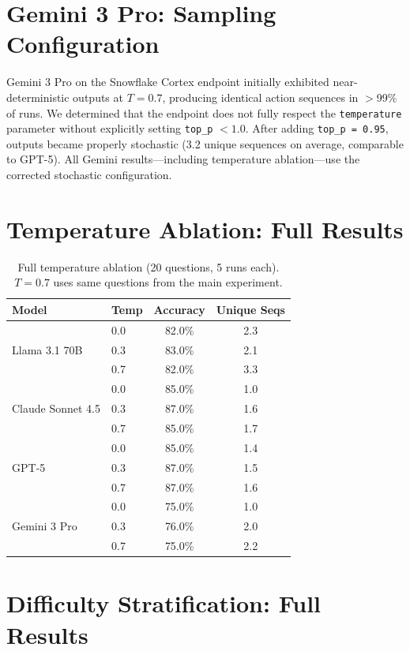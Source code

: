 \documentclass{article}
\begin{document}
\section{Gemini 3 Pro: Sampling Configuration}
\label{sec:gemini_note}

Gemini 3 Pro on the Snowflake Cortex endpoint initially exhibited near-deterministic outputs at $T\!=\!0.7$, producing identical action sequences in $>$99\% of runs. We determined that the endpoint does not fully respect the \texttt{temperature} parameter without explicitly setting \texttt{top\_p} $< 1.0$. After adding \texttt{top\_p = 0.95}, outputs became properly stochastic (3.2 unique sequences on average, comparable to GPT-5). All Gemini results---including temperature ablation---use the corrected stochastic configuration.

\section{Temperature Ablation: Full Results}
\label{app:temp}

\begin{table}[h]
\centering
\caption{Full temperature ablation (20 questions, 5 runs each). $T\!=\!0.7$ uses same questions from the main experiment.}
\small
\begin{tabular}{llcc}
\toprule
\textbf{Model} & \textbf{Temp} & \textbf{Accuracy} & \textbf{Unique Seqs} \\
\midrule
\multirow{3}{*}{Llama 3.1 70B} & 0.0 & 82.0\% & 2.3 \\
& 0.3 & 83.0\% & 2.1 \\
& 0.7 & 82.0\% & 3.3 \\
\midrule
\multirow{3}{*}{Claude Sonnet 4.5} & 0.0 & 85.0\% & 1.0 \\
& 0.3 & 87.0\% & 1.6 \\
& 0.7 & 85.0\% & 1.7 \\
\midrule
\multirow{3}{*}{GPT-5} & 0.0 & 85.0\% & 1.4 \\
& 0.3 & 87.0\% & 1.5 \\
& 0.7 & 87.0\% & 1.6 \\
\midrule
\multirow{3}{*}{Gemini 3 Pro} & 0.0 & 75.0\% & 1.0 \\
& 0.3 & 76.0\% & 2.0 \\
& 0.7 & 75.0\% & 2.2 \\
\bottomrule
\end{tabular}
\end{table}

\section{Difficulty Stratification: Full Results}
\label{app:difficulty}
\end{document}

